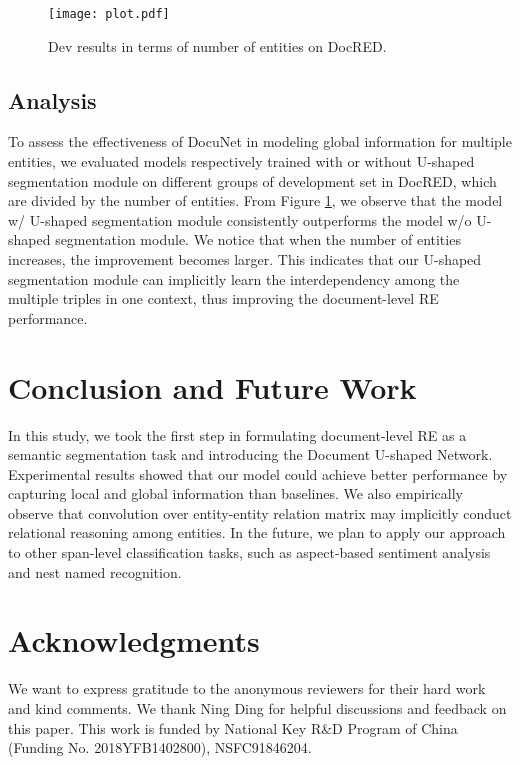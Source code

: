 \documentclass{article}
\begin{document}
\begin{figure}[h]
  \centering 
  \texttt{[image: plot.pdf]} 
  \caption{Dev results in terms of number of entities on  DocRED.}
 \label{plot}	
\end{figure}
 
 
\subsection{Analysis}
To assess the effectiveness of DocuNet in modeling global information for multiple entities, we evaluated models respectively trained with or without U-shaped segmentation module on different groups of development set in DocRED, which are divided by the number of entities. From Figure \ref{plot}, we observe that the model w/ U-shaped segmentation module consistently outperforms the model w/o U-shaped segmentation module. We notice that when the number of entities increases, the improvement becomes larger. This indicates that our U-shaped segmentation module can implicitly learn the interdependency among the multiple triples in one context, thus improving the document-level RE performance.



\section{Conclusion and Future Work} 

In this study, we took the first step in formulating document-level RE as a semantic segmentation task and introducing the Document U-shaped Network. Experimental results showed that our model could achieve better performance by capturing local and global information than baselines. We also empirically observe that convolution over entity-entity relation matrix may implicitly conduct relational reasoning among entities. In the future, we plan to apply our approach to other span-level classification tasks, such as aspect-based sentiment analysis and nest named recognition. 



\section*{Acknowledgments}
We  want to express gratitude to the anonymous reviewers for their hard work and kind comments. We thank Ning Ding for helpful discussions and feedback on this paper. This work is funded by National Key R\&D Program of China (Funding No. 2018YFB1402800), NSFC91846204.





\end{document}
